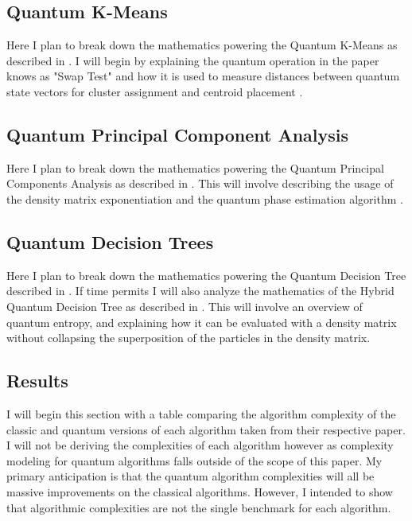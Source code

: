 \documentclass[conference]{IEEEtran}
\begin{document}
\subsection{Quantum K-Means}
Here I plan to break down the mathematics powering the Quantum K-Means as described in \cite{b6}. I will begin by explaining the quantum operation in the paper knows as "Swap Test" and how it is used to measure distances between quantum state vectors for cluster assignment and centroid placement \cite{b6}.
\subsection{Quantum Principal Component Analysis}
Here I plan to break down the mathematics powering the Quantum Principal Components Analysis as described in \cite{b7}. This will involve describing the usage of the density matrix exponentiation and the quantum phase estimation algorithm \cite{b7}.
\subsection{Quantum Decision Trees}
Here I plan to break down the mathematics powering the Quantum Decision Tree described in \cite{b13}. If time permits I will also analyze the mathematics of the Hybrid Quantum Decision Tree as described in \cite{b14}. This will involve an overview of quantum entropy, and explaining how it can be evaluated with a density matrix without collapsing the superposition of the particles in the density matrix. 


\subsection{Results}
I will begin this section with a table comparing the algorithm complexity of the classic and quantum versions of each algorithm taken from their respective paper. I will not be deriving the complexities of each algorithm however as complexity modeling for quantum algorithms falls outside of the scope of this paper. My primary anticipation is that  the quantum algorithm complexities will all be massive improvements on the classical algorithms. However, I intended to show that algorithmic complexities are not the single benchmark for each algorithm. 
\end{document}
